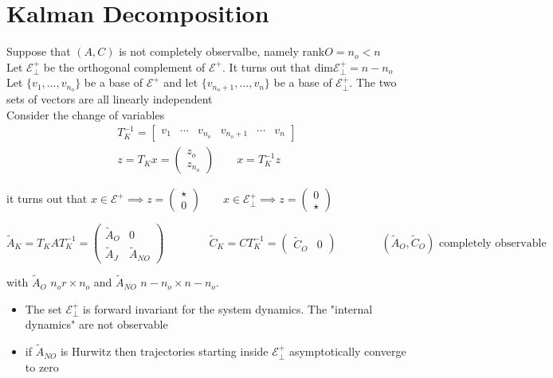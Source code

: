 \documentclass[english]{lectures}
\begin{document}
\section{Kalman Decomposition}

Suppose that $(A,C)$ is not completely observalbe, namely rank$O=n_o<n$\\
Let $\mathcal{E}^+_{\perp}$ be the orthogonal complement of $\mathcal{E}^+$. It turns out that dim$\mathcal{E}^+_{\perp}=n-n_o$ \\
Let $\{v_1,\dots,v_{n_o}\}$ be a base of $\mathcal{E}^+$ and let $\{v_{n_o+1},\dots,v_n\}$ be a base of $\mathcal{E}^+_{\perp}$. The two sets of vectors are all linearly independent\\
Consider the change of variables \begin{gather*}
    T_K^{-1}=\begin{bmatrix}
    v_1 &  \cdots & v_{n_o} & v_{n_o+1} & \cdots & v_n
\end{bmatrix}\\
z=T_Kx=\begin{pmatrix}
    z_o \\ z_{n_o}
\end{pmatrix} \qquad x=T_K^{-1}z
\end{gather*}

it turns out that $x\in \mathcal{E}^+ \implies z= \begin{pmatrix}
    \star \\ 0
\end{pmatrix} \qquad x\in\mathcal{E}^+_{\perp} \implies z= \begin{pmatrix}
    0 \\ \star
\end{pmatrix}$ 
\begin{result}
\[
    \tilde{A}_K=T_KAT_K^{-1}=\begin{pmatrix}
        \tilde{A}_O & 0\\
        \tilde{A}_J & \tilde{A}_{NO}
    \end{pmatrix} \qquad \qquad \tilde{C}_K=CT_K^{-1}=\begin{pmatrix}
        \tilde{C}_O & 0
    \end{pmatrix} \qquad \qquad (\tilde{A}_O,\tilde{C}_O) \text{ completely observable}
\]
\end{result}
with  $\tilde{A}_O$ $n_or\times n_o$ and $\tilde{A}_{NO}$ $n-n_o \times n-n_o$.\\
\begin{itemize}
    \item The set $\mathcal{E}^+_{\perp}$ is forward invariant for the system dynamics. The "internal dynamics" are not observable
    \item if $\tilde{A}_{NO}$ is Hurwitz then trajectories starting inside $\mathcal{E}^+_{\perp}$ asymptotically converge to zero
\end{itemize}
\end{document}
